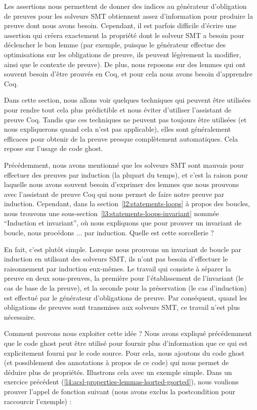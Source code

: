 Les assertions nous permettent de donner des indices au générateur
d'obligation de preuves pour les solveurs SMT obtiennent assez d'information
pour produire la preuve dont nous avons besoin. Cependant, il est parfois
difficile d'écrire une assertion qui créera exactement la propriété dont le
solveur SMT a besoin pour déclencher le bon lemme (par exemple, puisque le
générateur effectue des optimisations sur les obligations de preuve, ils peuvent
légèrement la modifier, ainsi que le contexte de preuve). De plus, nous
reposons sur des lemmes qui ont souvent besoin d'être prouvés en Coq, et pour
cela nous avons besoin d'apprendre Coq.


Dans cette section, nous allons voir quelques techniques qui peuvent être
utilisées pour rendre tout cela plus prédictible et nous éviter d'utiliser
l'assistant de preuve Coq. Tandis que ces techniques ne peuvent pas toujours
être utilisées (et nous expliquerons quand cela n'est pas applicable), elles
sont généralement efficaces pour obtenir de la preuve presque complètement
automatiques. Cela repose sur l'usage de code ghost.




Précédemment, nous avons mentionné que les solveurs SMT sont mauvais pour
effectuer des preuves par induction (la plupart du temps), et c'est la raison
pour laquelle nous avons souvent besoin d'exprimer des lemmes que nous prouvons
avec l'assistant de preuve Coq qui nous permet de faire notre preuve par
induction. Cependant, dans la section~\ref{l2:statements-loops} à propos des
boucles, nous trouvons une sous-section~\ref{l3:statements-loops-invariant}
nommée ``Induction et invariant'', où nous expliquons que pour prouver un
invariant de boucle, nous procédons ... par induction. Quelle est cette
sorcellerie ?


En fait, c'est plutôt simple. Lorsque nous prouvons un invariant de boucle par
induction en utilisant des solveurs SMT, ils n'ont pas besoin d'effectuer le
raisonnement par induction eux-mêmes. Le travail qui consiste à séparer la 
preuve en deux sous-preuves, la première pour l'établissement de l'invariant
(le cas de base de la preuve), et la seconde pour la préservation (le cas
d'induction) est effectué par le générateur d'obligations de preuve. 
Par conséquent, quand les obligations de preuves sont transmises aux solveurs
SMT, ce travail n'est plus nécessaire.


Comment pouvons nous exploiter cette idée ? Nous avons expliqué précédemment
que le code ghost peut être utilisé pour fournir plus d'information que ce qui
est explicitement fourni par le code source. Pour cela, nous ajoutons du code
ghost (et possiblement des annotations à propos de ce code) qui nous permet
de déduire plus de propriétés. Illustrons cela avec un exemple simple. Dans 
un exercice précédent (\ref{l4:acsl-properties-lemmas-lsorted-gsorted}), nous
voulions prouver l'appel de fonction suivant (nous avons exclus la
postcondition pour raccourcir l'exemple) :


